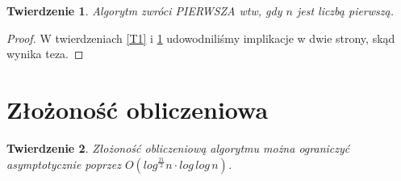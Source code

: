 \documentclass[declaration,shortabstract]{iithesis}
\theoremstyle{definition}
\theoremstyle{remark} \newtheorem{observation}{Obserwacja}
\theoremstyle{plain} \newtheorem{theorem}{Twierdzenie}
\theoremstyle{plain} \newtheorem{lemma}{Lemat}
\theoremstyle{remark} \newtheorem*{remark*}{Uwaga}
\theoremstyle{reminder} \newtheorem*{reminder*}{Przypomnienie}
\begin{document}
\begin{theorem} \label{T2}
	Algorytm zwróci \textit{PIERWSZA} wtw, gdy $n$ jest liczbą pierwszą.
\end{theorem}
	
\begin{proof}
	W twierdzeniach \ref{T1} i \ref{T2} udowodniliśmy implikacje w dwie strony, skąd wynika teza.
\end{proof}
	
\section{Złożoność obliczeniowa}
	
\begin{theorem}
	Złożoność obliczeniową algorytmu można ograniczyć asymptotycznie poprzez $O(log^{\frac{21}{2}}n \cdot log \, log \, n)$.
\end{theorem}
	
\end{document}
